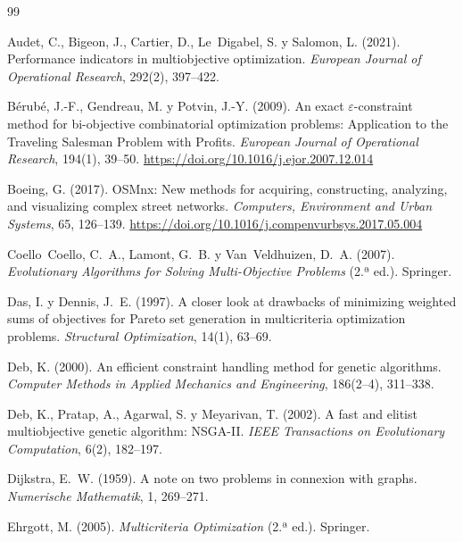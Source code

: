 \begin{thebibliography}{99}
\small

Audet, C., Bigeon, J., Cartier, D., Le~Digabel, S. y Salomon, L. (2021).
\newblock Performance indicators in multiobjective optimization.
\newblock \emph{European Journal of Operational Research}, 292(2), 397--422.

Bérubé, J.-F., Gendreau, M. y Potvin, J.-Y. (2009).
\newblock An exact $\varepsilon$-constraint method for bi-objective combinatorial optimization problems: Application to the Traveling Salesman Problem with Profits.
\newblock \emph{European Journal of Operational Research}, 194(1), 39--50.
\newblock \url{https://doi.org/10.1016/j.ejor.2007.12.014}

Boeing, G. (2017).
\newblock OSMnx: New methods for acquiring, constructing, analyzing, and visualizing complex street networks.
\newblock \emph{Computers, Environment and Urban Systems}, 65, 126--139.
\newblock \url{https://doi.org/10.1016/j.compenvurbsys.2017.05.004}

Coello~Coello, C.~A., Lamont, G.~B. y Van~Veldhuizen, D.~A. (2007).
\newblock \emph{Evolutionary Algorithms for Solving Multi-Objective Problems} (2.ª ed.).
\newblock Springer.

Das, I. y Dennis, J.~E. (1997).
\newblock A closer look at drawbacks of minimizing weighted sums of objectives for Pareto set generation in multicriteria optimization problems.
\newblock \emph{Structural Optimization}, 14(1), 63--69.

Deb, K. (2000).
\newblock An efficient constraint handling method for genetic algorithms.
\newblock \emph{Computer Methods in Applied Mechanics and Engineering}, 186(2--4), 311--338.

Deb, K., Pratap, A., Agarwal, S. y Meyarivan, T. (2002).
\newblock A fast and elitist multiobjective genetic algorithm: NSGA-II.
\newblock \emph{IEEE Transactions on Evolutionary Computation}, 6(2), 182--197.

Dijkstra, E.~W. (1959).
\newblock A note on two problems in connexion with graphs.
\newblock \emph{Numerische Mathematik}, 1, 269--271.

Ehrgott, M. (2005).
\newblock \emph{Multicriteria Optimization} (2.ª ed.).
\newblock Springer.


\end{thebibliography}
